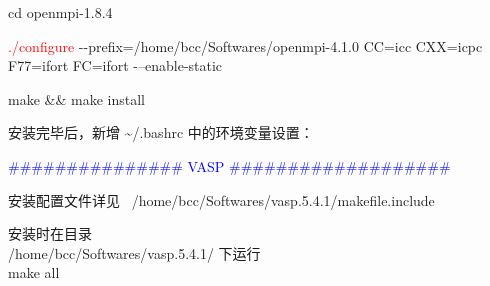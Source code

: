 cd openmpi-1.8.4

\textcolor{red}{./configure} -\/-prefix=/home/bcc/Softwares/openmpi-4.1.0 CC=icc CXX=icpc F77=ifort FC=ifort -\/--enable-static

make \&\& make install

安装完毕后，新增 \~\//.bashrc 中的环境变量设置：

\textcolor{blue}{\#\#\#\#\#\#\#\#\#\#\#\#\#\#\# VASP \#\#\#\#\#\#\#\#\#\#\#\#\#\#\#\#\#\#\#}

安装配置文件详见 ~/home/bcc/Softwares/vasp.5.4.1/makefile.include

安装时在目录\\
/home/bcc/Softwares/vasp.5.4.1/ 下运行\\
make all

